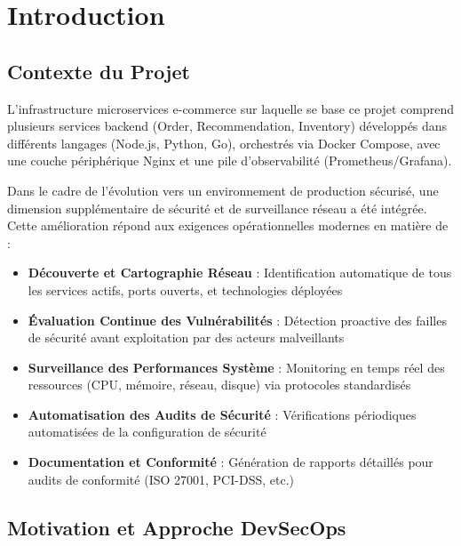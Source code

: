 \documentclass[11pt,a4paper]{report}
\begin{document}
\newpage
\tableofcontents
\newpage


\chapter{Introduction}

\section{Contexte du Projet}

L'infrastructure microservices e-commerce sur laquelle se base ce projet comprend plusieurs services backend (Order, Recommendation, Inventory) développés dans différents langages (Node.js, Python, Go), orchestrés via Docker Compose, avec une couche périphérique Nginx et une pile d'observabilité (Prometheus/Grafana).

Dans le cadre de l'évolution vers un environnement de production sécurisé, une dimension supplémentaire de sécurité et de surveillance réseau a été intégrée. Cette amélioration répond aux exigences opérationnelles modernes en matière de :

\begin{itemize}
    \item \textbf{Découverte et Cartographie Réseau} : Identification automatique de tous les services actifs, ports ouverts, et technologies déployées
    \item \textbf{Évaluation Continue des Vulnérabilités} : Détection proactive des failles de sécurité avant exploitation par des acteurs malveillants
    \item \textbf{Surveillance des Performances Système} : Monitoring en temps réel des ressources (CPU, mémoire, réseau, disque) via protocoles standardisés
    \item \textbf{Automatisation des Audits de Sécurité} : Vérifications périodiques automatisées de la configuration de sécurité
    \item \textbf{Documentation et Conformité} : Génération de rapports détaillés pour audits de conformité (ISO 27001, PCI-DSS, etc.)
\end{itemize}

\section{Motivation et Approche DevSecOps}
\end{document}
